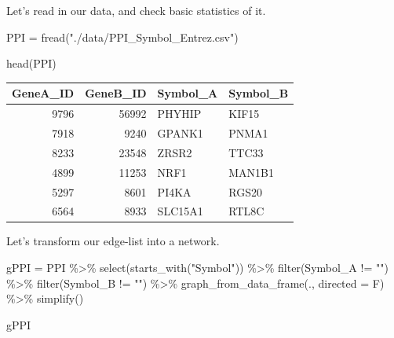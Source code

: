 \documentclass[
]{book}
\newenvironment{Shaded}{\begin{snugshade}}{\end{snugshade}}
\newcommand{\AttributeTok}[1]{\textcolor[rgb]{0.77,0.63,0.00}{#1}}
\newcommand{\FunctionTok}[1]{\textcolor[rgb]{0.00,0.00,0.00}{#1}}
\newcommand{\NormalTok}[1]{#1}
\newcommand{\OtherTok}[1]{\textcolor[rgb]{0.56,0.35,0.01}{#1}}
\newcommand{\SpecialCharTok}[1]{\textcolor[rgb]{0.00,0.00,0.00}{#1}}
\newcommand{\StringTok}[1]{\textcolor[rgb]{0.31,0.60,0.02}{#1}}
\begin{document}
Let's read in our data, and check basic statistics of it.

\begin{Shaded}
\begin{Highlighting}[]
\NormalTok{PPI }\OtherTok{=} \FunctionTok{fread}\NormalTok{(}\StringTok{"./data/PPI\_Symbol\_Entrez.csv"}\NormalTok{)}
\end{Highlighting}
\end{Shaded}

\begin{Shaded}
\begin{Highlighting}[]
\FunctionTok{head}\NormalTok{(PPI)}
\end{Highlighting}
\end{Shaded}

\begin{tabular}{r|r|l|l}
\hline
GeneA\_ID & GeneB\_ID & Symbol\_A & Symbol\_B\\
\hline
9796 & 56992 & PHYHIP & KIF15\\
\hline
7918 & 9240 & GPANK1 & PNMA1\\
\hline
8233 & 23548 & ZRSR2 & TTC33\\
\hline
4899 & 11253 & NRF1 & MAN1B1\\
\hline
5297 & 8601 & PI4KA & RGS20\\
\hline
6564 & 8933 & SLC15A1 & RTL8C\\
\hline
\end{tabular}

Let's transform our edge-list into a network.

\begin{Shaded}
\begin{Highlighting}[]
\NormalTok{gPPI }\OtherTok{=}\NormalTok{ PPI }\SpecialCharTok{\%\textgreater{}\%} 
  \FunctionTok{select}\NormalTok{(}\FunctionTok{starts\_with}\NormalTok{(}\StringTok{"Symbol"}\NormalTok{)) }\SpecialCharTok{\%\textgreater{}\%}
  \FunctionTok{filter}\NormalTok{(Symbol\_A }\SpecialCharTok{!=} \StringTok{""}\NormalTok{) }\SpecialCharTok{\%\textgreater{}\%}
  \FunctionTok{filter}\NormalTok{(Symbol\_B }\SpecialCharTok{!=} \StringTok{""}\NormalTok{) }\SpecialCharTok{\%\textgreater{}\%}
  \FunctionTok{graph\_from\_data\_frame}\NormalTok{(., }\AttributeTok{directed =}\NormalTok{ F) }\SpecialCharTok{\%\textgreater{}\%}
  \FunctionTok{simplify}\NormalTok{()}

\NormalTok{gPPI}
\end{Highlighting}
\end{Shaded}
\end{document}

